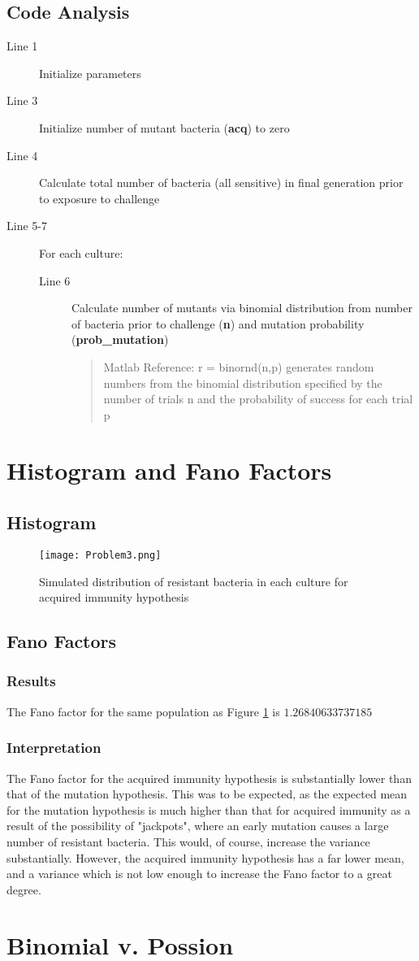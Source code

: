 \documentclass[titlepage]{scrreprt}
\begin{document}
\subsection{Code Analysis}
\begin{description}
    \item[Line 1] Initialize parameters
    \item[Line 3] Initialize number of mutant bacteria (\textbf{acq}) to zero
    \item[Line 4] Calculate total number of bacteria (all sensitive) in final generation prior to exposure to challenge
    \item[Line 5-7] For each culture:
    \begin{description}
        \item[Line 6] Calculate number of mutants via binomial distribution from number of bacteria prior to challenge (\textbf{n}) and mutation probability (\textbf{prob\_mutation})
        \begin{quote}
            Matlab Reference: r = binornd(n,p) generates random numbers from the binomial distribution specified by the number of trials n and the probability of success for each trial p
        \end{quote}
    \end{description}
\end{description}
\section{Histogram and Fano Factors}
\subsection{Histogram}
\begin{figure}[H]
    \centering
    \texttt{[image: Problem3.png]}
    \caption{Simulated distribution of resistant bacteria in each culture for acquired immunity hypothesis}
    \label{fig:problem3_histogram}
\end{figure}
\subsection{Fano Factors}
\subsubsection{Results}
The Fano factor for the same population as Figure \ref{fig:problem3_histogram} is $1.26840633737185$
\subsubsection{Interpretation}
The Fano factor for the acquired immunity hypothesis is substantially lower than that of the mutation hypothesis.  This was to be expected, as the expected mean for the mutation hypothesis is much higher than that for acquired immunity as a result of the possibility of "jackpots", where an early mutation causes a large number of resistant bacteria.  This would, of course, increase the variance substantially.  However, the acquired immunity hypothesis has a far lower mean, and a variance which is not low enough to increase the Fano factor to a great degree.
\section{Binomial v. Possion}
\end{document}
